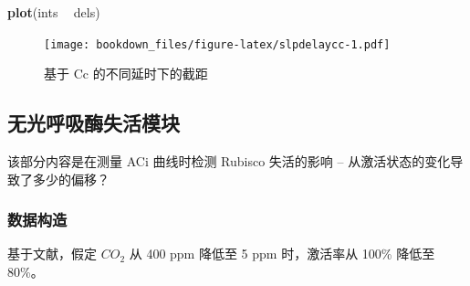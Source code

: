 \documentclass[
]{krantz}
\makeatletter
\newenvironment{Shaded}{\begin{snugshade}}{\end{snugshade}}
\newcommand{\KeywordTok}[1]{\textcolor[rgb]{0.13,0.29,0.53}{\textbf{#1}}}
\newcommand{\NormalTok}[1]{#1}
\newcommand{\OperatorTok}[1]{\textcolor[rgb]{0.81,0.36,0.00}{\textbf{#1}}}
\newcommand{\StringTok}[1]{\textcolor[rgb]{0.31,0.60,0.02}{#1}}
\newenvironment{kframe}{%
\medskip{}
\setlength{\fboxsep}{.8em}
 \def\at@end@of@kframe{}%
 \ifinner\ifhmode%
  \def\at@end@of@kframe{\end{minipage}}%
  \begin{minipage}{\columnwidth}%
 \fi\fi%
 \def\FrameCommand##1{\hskip\@totalleftmargin \hskip-\fboxsep
 \colorbox{shadecolor}{##1}\hskip-\fboxsep
     \hskip-\linewidth \hskip-\@totalleftmargin \hskip\columnwidth}%
 \MakeFramed {\advance\hsize-\width
   \@totalleftmargin\z@ \linewidth\hsize
   \@setminipage}}%
 {\par\unskip\endMakeFramed%
 \at@end@of@kframe}
\renewenvironment{Shaded}{\begin{kframe}}{\end{kframe}}
\makeatother
\begin{document}
\begin{Shaded}
\begin{Highlighting}[]
\KeywordTok{plot}\NormalTok{(ints }\OperatorTok{~}\StringTok{ }\NormalTok{dels)}
\end{Highlighting}
\end{Shaded}

\begin{figure}
\centering
\texttt{[image: bookdown\_files/figure-latex/slpdelaycc-1.pdf]}
\caption{\label{fig:slpdelaycc}基于 Cc 的不同延时下的截距}
\end{figure}

\hypertarget{no-phoresp-rubi}{%
\subsection{无光呼吸酶失活模块}\label{no-phoresp-rubi}}

该部分内容是在测量 ACi 曲线时检测 Rubisco 失活的影响 -- 从激活状态的变化导致了多少的偏移？

\hypertarget{data-pre}{%
\subsubsection{数据构造}\label{data-pre}}

基于文献，假定 \(CO_2\) 从 400 ppm 降低至 5 ppm 时，激活率从 100\% 降低至 80\%。
\end{document}
